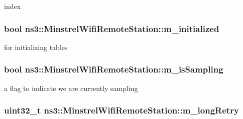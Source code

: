 index 

\subsubsection[{\texorpdfstring{m\+\_\+initialized}{m_initialized}}]{\setlength{\rightskip}{0pt plus 5cm}bool ns3\+::\+Minstrel\+Wifi\+Remote\+Station\+::m\+\_\+initialized}\hypertarget{structns3_1_1MinstrelWifiRemoteStation_a430ab94b617c8be6ca686a06f631a025}{}\label{structns3_1_1MinstrelWifiRemoteStation_a430ab94b617c8be6ca686a06f631a025}


for initializing tables 

\subsubsection[{\texorpdfstring{m\+\_\+is\+Sampling}{m_isSampling}}]{\setlength{\rightskip}{0pt plus 5cm}bool ns3\+::\+Minstrel\+Wifi\+Remote\+Station\+::m\+\_\+is\+Sampling}\hypertarget{structns3_1_1MinstrelWifiRemoteStation_a8114992df4a3a1984836c61c6a1a1298}{}\label{structns3_1_1MinstrelWifiRemoteStation_a8114992df4a3a1984836c61c6a1a1298}


a flag to indicate we are currently sampling 

\subsubsection[{\texorpdfstring{m\+\_\+long\+Retry}{m_longRetry}}]{\setlength{\rightskip}{0pt plus 5cm}uint32\+\_\+t ns3\+::\+Minstrel\+Wifi\+Remote\+Station\+::m\+\_\+long\+Retry}\hypertarget{structns3_1_1MinstrelWifiRemoteStation_adee192fc860dc7ae9fe4cbe4e07322ec}{}\label{structns3_1_1MinstrelWifiRemoteStation_adee192fc860dc7ae9fe4cbe4e07322ec}


